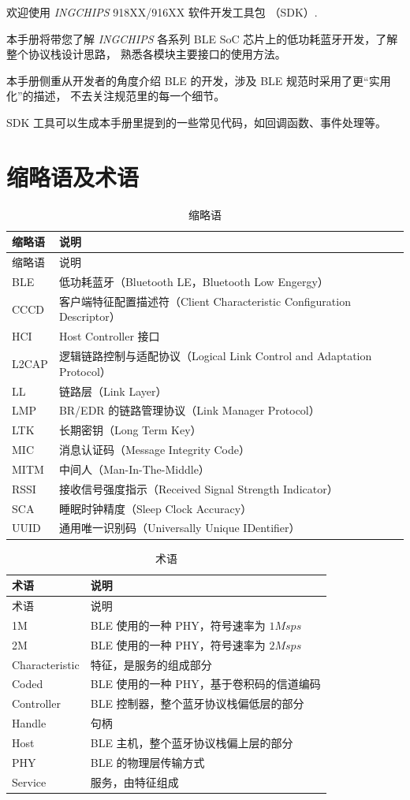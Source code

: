 \documentclass[
  12pt,
]{book}
\begin{document}
欢迎使用 \emph{INGCHIPS} 918XX/916XX 软件开发工具包 （SDK）.

本手册将带您了解 \emph{INGCHIPS} 各系列 BLE SoC 芯片上的低功耗蓝牙开发，了解整个协议栈设计思路，
熟悉各模块主要接口的使用方法。

本手册侧重从开发者的角度介绍 BLE 的开发，涉及 BLE 规范时采用了更``实用化''的描述，
不去关注规范里的每一个细节。

SDK 工具可以生成本手册里提到的一些常见代码，如回调函数、事件处理等。

\hypertarget{ux7f29ux7565ux8bedux53caux672fux8bed}{%
\section{缩略语及术语}\label{ux7f29ux7565ux8bedux53caux672fux8bed}}

\begin{longtable}[]{@{}ll@{}}
\caption{\label{tab:ch0-abbreviations} 缩略语}\tabularnewline
\toprule
缩略语 & 说明\tabularnewline
\midrule
\endfirsthead
\toprule
缩略语 & 说明\tabularnewline
\midrule
\endhead
BLE & 低功耗蓝牙（Bluetooth LE，Bluetooth Low Engergy）\tabularnewline
CCCD & 客户端特征配置描述符（Client Characteristic Configuration Descriptor）\tabularnewline
HCI & Host Controller 接口\tabularnewline
L2CAP & 逻辑链路控制与适配协议（Logical Link Control and Adaptation Protocol）\tabularnewline
LL & 链路层（Link Layer）\tabularnewline
LMP & BR/EDR 的链路管理协议（Link Manager Protocol）\tabularnewline
LTK & 长期密钥（Long Term Key）\tabularnewline
MIC & 消息认证码（Message Integrity Code）\tabularnewline
MITM & 中间人（Man-In-The-Middle）\tabularnewline
RSSI & 接收信号强度指示（Received Signal Strength Indicator）\tabularnewline
SCA & 睡眠时钟精度（Sleep Clock Accuracy）\tabularnewline
UUID & 通用唯一识别码（Universally Unique IDentifier）\tabularnewline
\bottomrule
\end{longtable}

\begin{longtable}[]{@{}ll@{}}
\caption{\label{tab:ch0-term} 术语}\tabularnewline
\toprule
术语 & 说明\tabularnewline
\midrule
\endfirsthead
\toprule
术语 & 说明\tabularnewline
\midrule
\endhead
1M & BLE 使用的一种 PHY，符号速率为 \(1Msps\)\tabularnewline
2M & BLE 使用的一种 PHY，符号速率为 \(2Msps\)\tabularnewline
Characteristic & 特征，是服务的组成部分\tabularnewline
Coded & BLE 使用的一种 PHY，基于卷积码的信道编码\tabularnewline
Controller & BLE 控制器，整个蓝牙协议栈偏低层的部分\tabularnewline
Handle & 句柄\tabularnewline
Host & BLE 主机，整个蓝牙协议栈偏上层的部分\tabularnewline
PHY & BLE 的物理层传输方式\tabularnewline
Service & 服务，由特征组成\tabularnewline
\bottomrule
\end{longtable}
\end{document}
